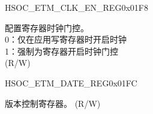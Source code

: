 \begin{register}{H}{SOC\_ETM\_CLK\_EN\_REG}{0x01F8}\label{regdesc:SOCETMCLKENREG}
%
%
\regnewline%
\begin{regdesc}\begin{reglist}
\label{fielddesc:SOCETMCLKEN}\item [SOC\_ETM\_CLK\_EN] 配置寄存器时钟门控。\\
0：仅在应用写寄存器时开启时钟\\
1：强制为寄存器开启时钟门控\\ (R/W)
\end{reglist}\end{regdesc}
\end{register}


\begin{register}{H}{SOC\_ETM\_DATE\_REG}{0x01FC}\label{regdesc:SOCETMDATEREG}
%
%
\regnewline%
\begin{regdesc}\begin{reglist}
\label{fielddesc:SOCETMDATE}\item [SOC\_ETM\_DATE] 版本控制寄存器。 (R/W)
\end{reglist}\end{regdesc}
\end{register}
